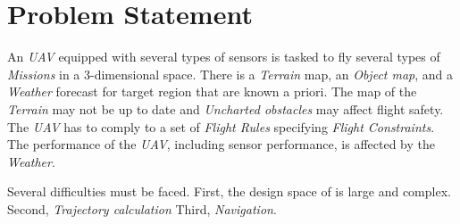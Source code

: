 \cleardoublepage
\chapter{Problem Statement}\label{c:problemStatement}

\noindent An \emph{UAV} equipped with several types of sensors is tasked to fly several types of \emph{Missions} in a 3-dimensional space. There is a \emph{Terrain} map, an \emph{Object map}, and a \emph{Weather} forecast for target region that are  known a priori. The map of the \emph{Terrain} may not be up to date and \emph{Uncharted obstacles} may affect flight safety. The \emph{UAV} has to comply to a set of \emph{Flight Rules} specifying \emph{Flight Constraints}. The performance of the \emph{UAV}, including sensor performance, is affected by the \emph{Weather}.


Several difficulties must be faced.  First, the design space of is large and complex. Second, \emph{Trajectory calculation} Third, \emph{Navigation}.